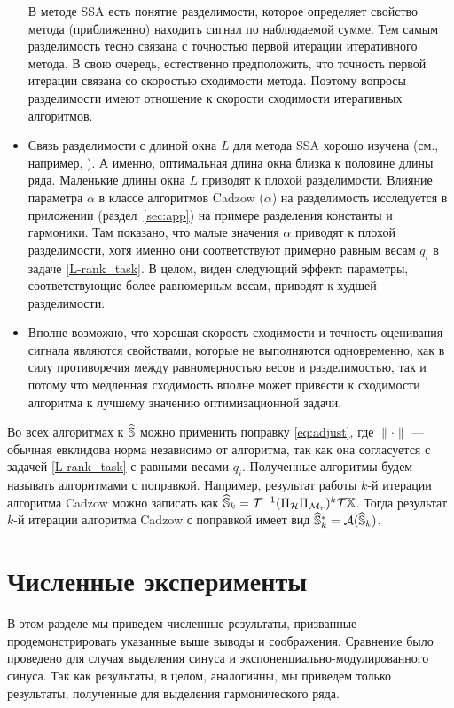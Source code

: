\documentclass[12pt,a4paper,fleqn,leqno]{article}
\begin{document}
\begin{itemize}
В методе SSA есть понятие разделимости, которое определяет свойство метода (приближенно) находить сигнал по наблюдаемой сумме. Тем самым разделимость
тесно связана с точностью первой итерации итеративного метода. В свою очередь, естественно предположить, что точность первой итерации связана со скоростью сходимости метода. Поэтому вопросы разделимости имеют отношение к скорости сходимости итеративных алгоритмов.
\item
Связь разделимости с длиной окна $L$ для метода SSA хорошо изучена (см., например, \cite{Golyandina2010}). А именно, оптимальная длина окна близка
к половине длины ряда. Маленькие длины окна $L$ приводят к плохой разделимости. Влияние параметра $\alpha$ в классе алгоритмов
Cadzow ($\alpha$) на разделимость исследуется в приложении (раздел~\ref{sec:app}) на примере разделения константы и гармоники. Там показано, что малые значения
$\alpha$ приводят к плохой разделимости, хотя именно они соответствуют примерно равным весам $q_i$ в задаче \eqref{L-rank_task}.
В целом, виден следующий эффект: параметры, соответствующие более равномерным весам, приводят к худшей разделимости.
\item
Вполне возможно, что хорошая скорость сходимости и точность оценивания сигнала являются свойствами, которые не выполняются одновременно, как в силу
противоречия между равномерностью весов и разделимостью, так и потому что медленная сходимость вполне может привести к сходимости алгоритма к лучшему значению оптимизационной задачи.
\end{itemize}

\begin{remark}
\label{rem:adjust}
Во всех алгоритмах к $\widehat{\mathbb{S}}$ можно применить поправку \eqref{eq:adjust}, где $\|\cdot\|$ --- обычная евклидова норма независимо от алгоритма,
так как она согласуется с задачей \eqref{L-rank_task} с равными весами $q_i$. 
Полученные алгоритмы будем называть алгоритмами с поправкой.
Например, результат работы $k$-й итерации алгоритма Cadzow можно записать как $\widehat{\mathbb{S}}_k = \mathcal{T}^{-1}(\Pi_{\mathcal{H}} \Pi_{\mathcal{M}_r})^k \mathcal{T} \mathbb{X}$.
Тогда результат $k$-й итерации алгоритма Cadzow с поправкой имеет вид $\widehat{\mathbb{S}}_k^*=\mathcal{A}(\widehat{\mathbb{S}}_k)$.
\end{remark}

\section{Численные эксперименты}
\label{sec:simul}
В этом разделе мы приведем численные результаты, призванные продемонстрировать указанные выше выводы и соображения.
Сравнение было проведено для случая выделения синуса и экспоненциально-модулированного синуса.
Так как результаты, в целом, аналогичны, мы приведем только результаты, полученные для выделения гармонического ряда.
\end{document}
